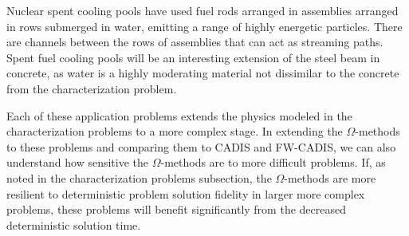 Nuclear spent cooling pools have used fuel rods arranged in assemblies arranged in rows submerged
in water, emitting a range of highly energetic particles. There are channels
between the rows of assemblies that can act as streaming paths. Spent fuel cooling
pools will be an interesting extension of the steel beam in concrete, as water
is a highly moderating material not dissimilar to the concrete from the
characterization problem. 

Each of these application problems extends the physics modeled in the
characterization problems to a more complex stage. In extending the
$\Omega$-methods to these problems and comparing them to CADIS and FW-CADIS, we
can also understand how sensitive the $\Omega$-methods are to more difficult
problems. If, as noted in the characterization problems subsection, the
$\Omega$-methods are more resilient to deterministic problem solution fidelity
in larger more complex problems,
these problems will benefit significantly from the decreased deterministic
solution time.
